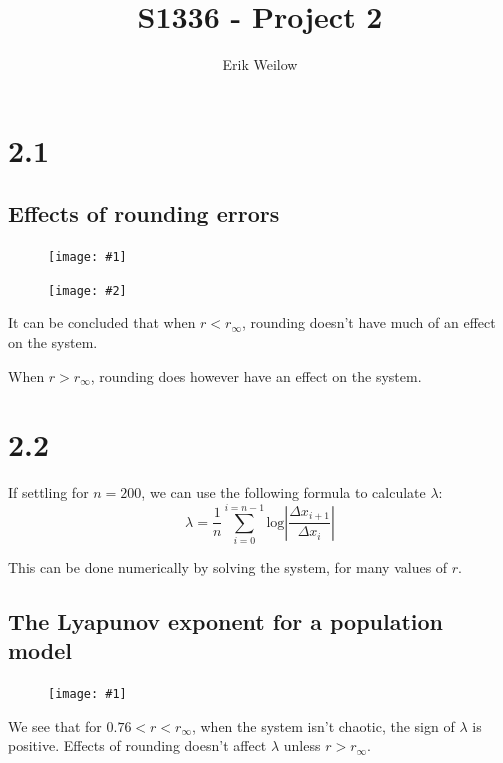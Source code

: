 \documentclass[11pt]{article}
\title{S1336 - Project 2}
\author{Erik Weilow}
\newcommand{\doublefigure}[2]{
\begin{figure}[H]
  \centering
  \begin{minipage}{0.45\textwidth}
    \centering
    \texttt{[image: \#1]}
  \end{minipage}
  \begin{minipage}{0.45\textwidth}
    \centering
    \texttt{[image: \#2]}
  \end{minipage}
\end{figure}
}
\newcommand{\singlefigure}[1]{
\begin{figure}[H]
  \centering
  \begin{minipage}{0.4\textwidth}
    \centering
    \texttt{[image: \#1]}
  \end{minipage}
\end{figure}
}
\begin{document}
\maketitle
\newpage

\section*{2.1}

\subsection*{Effects of rounding errors}
\doublefigure{./plots/2_1/r06.png}{./plots/2_1/r091.png}

It can be concluded that when $r < r_\infty$, rounding doesn't have much of an effect on the system.

When $r > r_\infty$, rounding does however have an effect on the system.

\section*{2.2}

If settling for $n=200$, we can use the following formula to calculate $\lambda$:
$$
\lambda = \frac{1}{n} \sum_{i=0}^{i=n-1}{\text{log}\left| \frac{\Delta x_{i+1}}{\Delta x_i}\right|}
$$

This can be done numerically by solving the system, for many values of $r$.

\subsection*{The Lyapunov exponent for a population model}
\singlefigure{./plots/2_2/study.png}
We see that for $0.76 < r < r_\infty$, when the system isn't chaotic, the sign of $\lambda$ is positive.
Effects of rounding doesn't affect $\lambda$ unless $r > r_\infty$.
\end{document}
